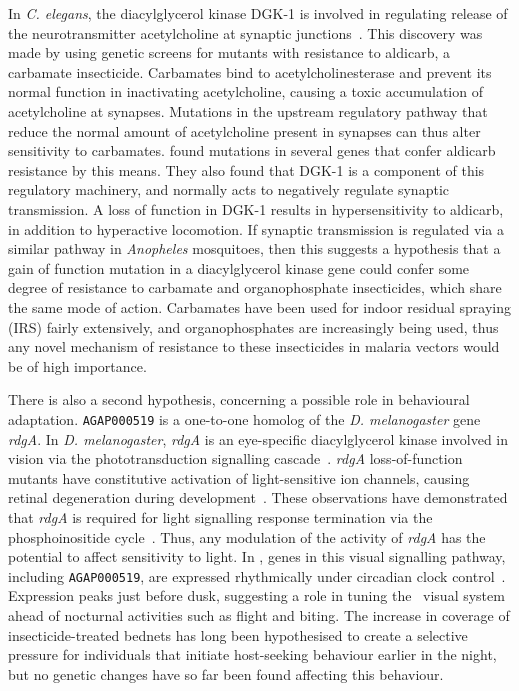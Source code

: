 \begin{refsection}
In \textit{C. elegans}, the diacylglycerol kinase DGK-1 is involved in regulating release of the neurotransmitter acetylcholine at synaptic junctions~\parencite{Miller1999}.
%
This discovery was made by using genetic screens for mutants with resistance to aldicarb, a carbamate insecticide.
%
Carbamates bind to acetylcholinesterase and prevent its normal function in inactivating acetylcholine, causing a toxic accumulation of acetylcholine at synapses.
%
Mutations in the upstream regulatory pathway that reduce the normal amount of acetylcholine present in synapses can thus alter sensitivity to carbamates.
%
\textcite{Miller1999} found mutations in several genes that confer aldicarb resistance by this means.
%
They also found that DGK-1 is a component of this regulatory machinery, and normally acts to negatively regulate synaptic transmission.
%
A loss of function in DGK-1 results in hypersensitivity to aldicarb, in addition to hyperactive locomotion.
%
If synaptic transmission is regulated via a similar pathway in \textit{Anopheles} mosquitoes, then this suggests a hypothesis that a gain of function mutation in a diacylglycerol kinase gene could confer some degree of resistance to carbamate and organophosphate insecticides, which share the same mode of action.
%
Carbamates have been used for indoor residual spraying (IRS) fairly extensively, and organophosphates are increasingly being used, thus any novel mechanism of resistance to these insecticides in malaria vectors would be of high importance.


There is also a second hypothesis, concerning a possible role in behavioural adaptation.
%
\texttt{AGAP000519} is a one-to-one homolog of the \textit{D. melanogaster} gene \textit{rdgA}.
%
In \textit{D. melanogaster}, \textit{rdgA} is an eye-specific diacylglycerol kinase involved in vision via the phototransduction signalling cascade~\parencite{Masai1993}.
%
\textit{rdgA} loss-of-function mutants have constitutive activation of light-sensitive ion channels, causing retinal degeneration during development~\parencite{Raghu2000}.
%
These observations have demonstrated that \textit{rdgA} is required for light signalling response termination via the phosphoinositide cycle~\parencite{Katz2009}.
%
Thus, any modulation of the activity of \textit{rdgA} has the potential to affect sensitivity to light.
%
In \agam, genes in this visual signalling pathway, including \texttt{AGAP000519}, are expressed rhythmically under circadian clock control~\parencite{Rund2011}.
%
Expression peaks just before dusk, suggesting a role in tuning the \agam\ visual system ahead of nocturnal activities such as flight and biting.
%
The increase in coverage of insecticide-treated bednets has long been hypothesised to create a selective pressure for individuals that initiate host-seeking behaviour earlier in the night, but no genetic changes have so far been found affecting this behaviour.
%



\end{refsection}
